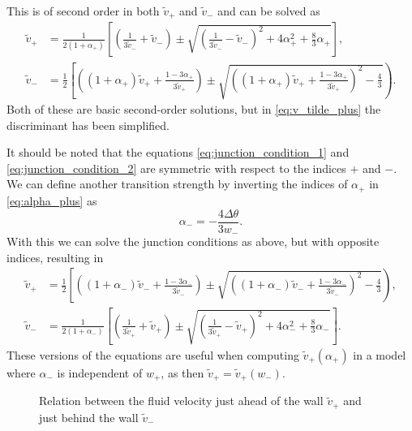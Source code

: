 This is of second order in both $\tilde{v}_+$ and $\tilde{v}_-$ and can be solved as \cite[eq. B.6, B.7]{hindmarsh_gw_pt_2019}
\begin{align}
\tilde{v}_+ &= \frac{1}{2(1+\alpha_+)}\left[ \left(\frac{1}{3\tilde{v}_-}+\tilde{v}_-\right) \pm \sqrt{\left(\frac{1}{3\tilde{v}_-} - \tilde{v}_- \right)^2 + 4\alpha_+^2 + \frac{8}{3} \alpha_+} \right],
\label{eq:v_tilde_plus}
\\
\tilde{v}_- &= \frac{1}{2} \left[ \left( (1+\alpha_+)\tilde{v}_+ + \frac{1-3\alpha_+}{3\tilde{v}_+} \right) \pm \sqrt{\left((1+\alpha_+)\tilde{v}_+ + \frac{1-3\alpha_+}{3\tilde{v}_+} \right)^2 - \frac{4}{3}} \right).
\label{eq:v_tilde_minus}
\end{align}
Both of these are basic second-order solutions, but in \eqref{eq:v_tilde_plus} the discriminant has been simplified.

It should be noted that the equations \ref{eq:junction_condition_1} and \ref{eq:junction_condition_2} are symmetric with respect to the indices $+$ and $-$.
We can define another transition strength by inverting the indices of $\alpha_+$ in \ref{eq:alpha_plus} as
\begin{equation}
\alpha_- = - \frac{4 \Delta \theta}{3 w_-}.
\end{equation}
With this we can solve the junction conditions as above, but with opposite indices, resulting in
\begin{align}
\tilde{v}_+ &= \frac{1}{2} \left[ \left( (1+\alpha_-)\tilde{v}_- + \frac{1-3\alpha_-}{3\tilde{v}_-} \right) \pm \sqrt{\left((1+\alpha_-)\tilde{v}_- + \frac{1-3\alpha_-}{3\tilde{v}_-} \right)^2 - \frac{4}{3}} \right),
\label{eq:v_tilde_plus_reverse}
\\
\tilde{v}_- &= \frac{1}{2(1+\alpha_-)}\left[ \left(\frac{1}{3\tilde{v}_+}+\tilde{v}_+\right) \pm \sqrt{\left(\frac{1}{3\tilde{v}_+} - \tilde{v}_+ \right)^2 + 4\alpha_-^2 + \frac{8}{3} \alpha_-} \right].
\label{eq:v_tilde_minus_reverse}
\end{align}
These versions of the equations are useful when computing $\tilde{v}_+(\alpha_+)$ in a model where $\alpha_-$ is independent of $w_+$, as then $\tilde{v}_+ = \tilde{v}_+(w_-)$.

\begin{figure}[h!]
\centering
{}
\caption{Relation between the fluid velocity just ahead of the wall $\tilde{v}_+$ and just behind the wall $\tilde{v}_-$ \cite[fig. 13]{lecture_notes}}
\label{fig:vplus_vminus}
\end{figure}

